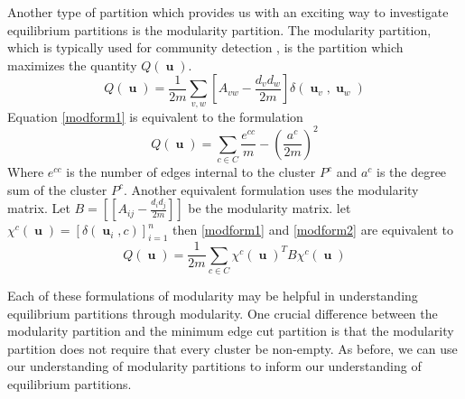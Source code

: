 \documentclass[]{article}
\DeclareMathOperator{\uu}{\mathbf{u}}
\begin{document}
	Another type of partition which provides us with an exciting way to investigate equilibrium partitions is the modularity partition. The modularity partition, which is typically used for community detection \cite{Newman2006,Clauset2004}, is the partition which maximizes the quantity $Q(\uu)$.
		\begin{equation}\label{modform1}
			Q(\uu) = \frac{1}{2m}\sum_{v,w}\left[A_{vw}-\frac{d_vd_w}{2m}\right]\delta(\uu_v,\uu_w)
		\end{equation}
		Equation \eqref{modform1} is equivalent to the formulation
		\begin{equation}\label{modform2}
			Q(\uu)=\sum_{c\in C}\frac{e^{cc}}{m}-\left(\frac{a^c}{2m}\right)^2
		\end{equation}
		Where $e^{cc}$ is the number of edges internal to the cluster $P^c$ and $a^c$ is the degree sum of the cluster $P^c$. Another equivalent formulation uses the modularity matrix.
		Let $B=[[A_{ij}-\frac{d_id_j}{2m}]]$ be the modularity matrix. let $\chi^{c}(\uu)=[\delta (\uu_i,c)]_{i=1}^n$ then \eqref{modform1} and \eqref{modform2} are equivalent to 
		\begin{equation}
			Q(\uu)= \frac{1}{2m}\sum_{c\in C} {\chi^c(\uu)}^TB\chi^c(\uu)
		\end{equation}
	
		Each of these formulations of modularity may be helpful in understanding equilibrium partitions through modularity. One crucial difference between the modularity partition and the minimum edge cut partition is that the modularity partition does not require that every cluster be non-empty. As before, we can use our understanding of modularity partitions to inform our understanding of equilibrium partitions. 
		
\end{document}

